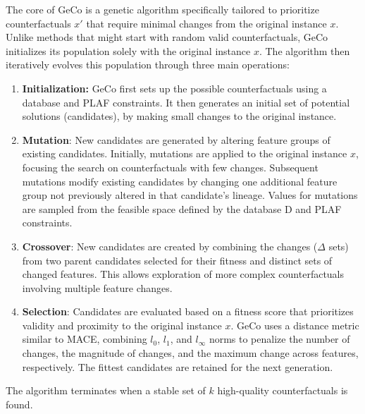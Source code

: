 The core of GeCo is a genetic algorithm specifically tailored to prioritize counterfactuals $x'$ that require minimal changes from the original instance $x$. Unlike methods that might start with random valid counterfactuals, GeCo initializes its population solely with the original instance $x$. The algorithm then iteratively evolves this population through three main operations:
\begin{enumerate}
    \item \textbf{Initialization:} GeCo first sets up the possible counterfactuals using a database and PLAF constraints. It then generates an initial set of potential solutions (candidates), by making small changes to the original instance.
    \item \textbf{Mutation}: New candidates are generated by altering feature groups of existing candidates. Initially, mutations are applied to the original instance $x$, focusing the search on counterfactuals with few changes. Subsequent mutations modify existing candidates by changing one additional feature group not previously altered in that candidate's lineage. Values for mutations are sampled from the feasible space defined by the database D and PLAF constraints.
    \item \textbf{Crossover}: New candidates are created by combining the changes ($\Delta$ sets) from two parent candidates selected for their fitness and distinct sets of changed features. This allows exploration of more complex counterfactuals involving multiple feature changes.
    \item \textbf{Selection}: Candidates are evaluated based on a fitness score that prioritizes validity and proximity to the original instance $x$. GeCo uses a distance metric similar to MACE, combining $l_0$, $l_1$, and $l_\infty$ norms to penalize the number of changes, the magnitude of changes, and the maximum change across features, respectively. The fittest candidates are retained for the next generation.
\end{enumerate}

The algorithm terminates when a stable set of $k$ high-quality counterfactuals is found.

